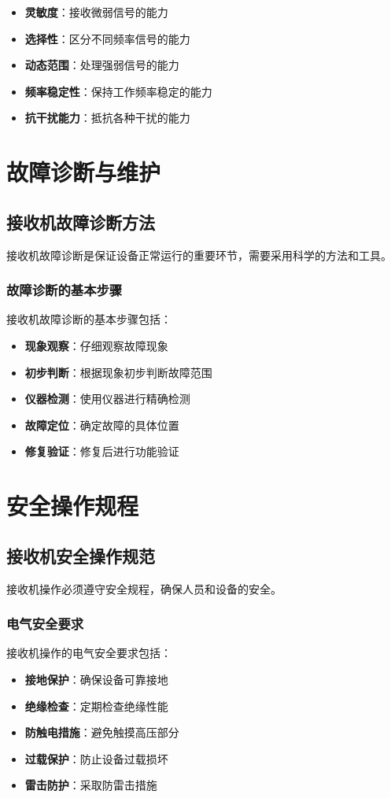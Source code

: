 \documentclass[12pt,UTF8]{ctexbook}
\begin{document}
\begin{itemize}[leftmargin=3.5em]
    \item \textbf{灵敏度}：接收微弱信号的能力
    \item \textbf{选择性}：区分不同频率信号的能力
    \item \textbf{动态范围}：处理强弱信号的能力
    \item \textbf{频率稳定性}：保持工作频率稳定的能力
    \item \textbf{抗干扰能力}：抵抗各种干扰的能力
\end{itemize}

\chapter{故障诊断与维护}

\section{接收机故障诊断方法}

接收机故障诊断是保证设备正常运行的重要环节，需要采用科学的方法和工具。

\subsection{故障诊断的基本步骤}

接收机故障诊断的基本步骤包括：

\begin{itemize}[leftmargin=3.5em]
    \item \textbf{现象观察}：仔细观察故障现象
    \item \textbf{初步判断}：根据现象初步判断故障范围
    \item \textbf{仪器检测}：使用仪器进行精确检测
    \item \textbf{故障定位}：确定故障的具体位置
    \item \textbf{修复验证}：修复后进行功能验证
\end{itemize}

\chapter{安全操作规程}

\section{接收机安全操作规范}

接收机操作必须遵守安全规程，确保人员和设备的安全。

\subsection{电气安全要求}

接收机操作的电气安全要求包括：

\begin{itemize}[leftmargin=3.5em]
    \item \textbf{接地保护}：确保设备可靠接地
    \item \textbf{绝缘检查}：定期检查绝缘性能
    \item \textbf{防触电措施}：避免触摸高压部分
    \item \textbf{过载保护}：防止设备过载损坏
    \item \textbf{雷击防护}：采取防雷击措施
\end{itemize}

\backmatter
\end{document}
